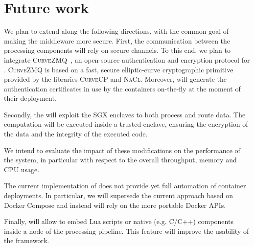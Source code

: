 \section{Future work}
\label{sec:future}


We plan to extend \SYS along the following directions, with the common goal of making the middleware more secure.
First, the communication between the processing components will rely on secure channels.
To this end, we plan to integrate \textsc{CurveZMQ}~\cite{zmq:curvezmq}, an open-source authentication and encryption protocol for \zmq.
\textsc{CurveZMQ} is based on a fast, secure elliptic-curve cryptographic primitive provided by the libraries \textsc{CurveCP}\cite{zmq:curvecp} and \textsc{NaCl}\cite{zmq:nacl}.
Moreover, \SYS will generate the authentication certificates in use by the containers on-the-fly at the moment of their deployment.

Secondly, the \SYS will exploit the SGX enclaves to both process and route data.
The computation will be executed inside a trusted enclave, ensuring the encryption of the data and the integrity of the executed code.

We intend to evaluate the impact of these modifications on the performance of the system, in particular with respect to the overall throughput, memory and CPU usage.

The current implementation of \SYS does not provide yet full automation of container deployments.
In particular, we will supersede the current approach based on Docker Compose and instead will rely on the more portable Docker APIs.

Finally, \SYS will allow to embed Lua scripts or native (e.g. C/C++) components inside a node of the processing pipeline.
This feature will improve the usability of the framework.
